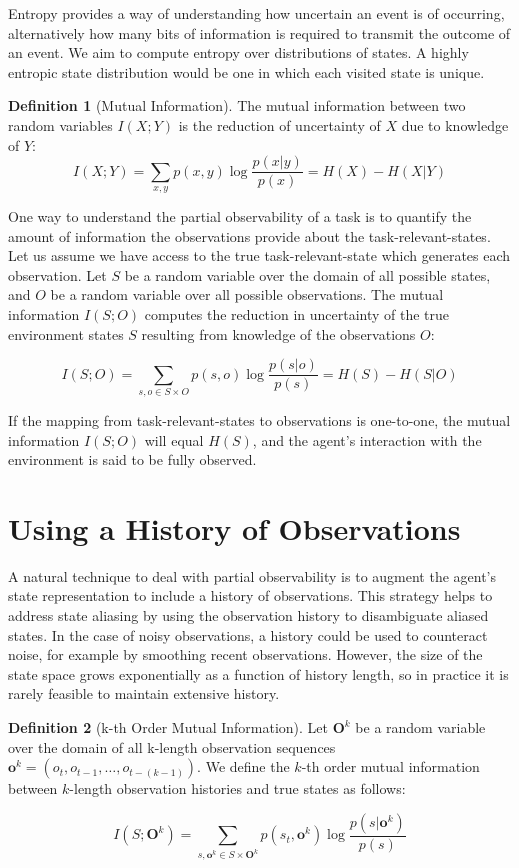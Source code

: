 \documentclass{article} %
\theoremstyle{definition}
\newtheorem{definition}{Definition}[section]
\begin{document}
Entropy provides a way of understanding how uncertain an event is of
occurring, alternatively how many bits of information is required to
transmit the outcome of an event. We aim to compute entropy over
distributions of states. A highly entropic state distribution would be
one in which each visited state is unique.

\begin{definition}[Mutual Information]
The mutual information between two random variables $I(X;Y)$ is the
reduction of uncertainty of $X$ due to knowledge of $Y$:
\[
I(X;Y) = \sum_{x,y} p(x,y) \log \frac{p(x|y)}{p(x)} = H(X) - H(X|Y)
\]
\end{definition}

One way to understand the partial observability of a task is to
quantify the amount of information the observations provide about the
task-relevant-states. Let us assume we have access to the true
task-relevant-state which generates each observation. Let $S$ be a
random variable over the domain of all possible states, and $O$ be a
random variable over all possible observations. The mutual information
$I(S;O)$ computes the reduction in uncertainty of the true environment
states $S$ resulting from knowledge of the observations $O$:

\[
I(S;O) = \sum_{s,o \in S \times O} p(s,o) \log \frac{p(s|o)}{p(s)} = H(S) - H(S|O)
\]

If the mapping from task-relevant-states to observations is
one-to-one, the mutual information $I(S;O)$ will equal $H(S)$, and the
agent's interaction with the environment is said to be fully observed.

\section{Using a History of Observations}
A natural technique to deal with partial observability is to augment
the agent's state representation to include a history of
observations. This strategy helps to address state aliasing by using
the observation history to disambiguate aliased states. In the case of
noisy observations, a history could be used to counteract noise, for
example by smoothing recent observations. However, the size of the
state space grows exponentially as a function of history length, so in
practice it is rarely feasible to maintain extensive history.

\begin{definition}[k-th Order Mutual Information]
Let $\textbf{O}^k$ be a random variable over the domain of all
k-length observation sequences $\textbf{o}^k = (o_t, o_{t-1}, \dots,
o_{t-(k-1)})$. We define the $k$-th order mutual information between
$k$-length observation histories and true states as follows:

\[
I(S;\textbf{O}^k) = \sum_{s,\textbf{o}^k \in S \times \textbf{O}^k} p(s_t,\textbf{o}^k) \log \frac{p(s|\textbf{o}^k)}{p(s)}
\]
\end{definition}
\end{document}
